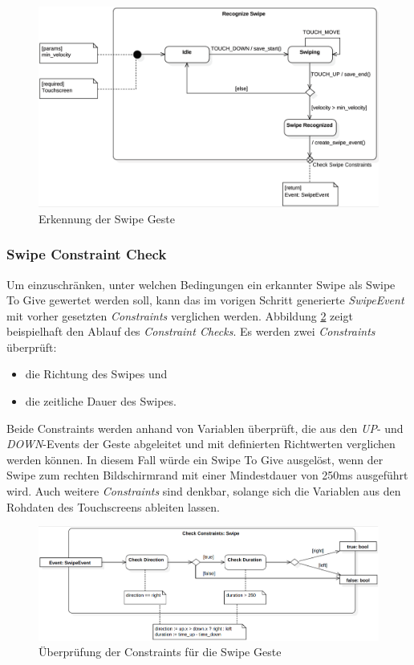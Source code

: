 {\begin{figure}[h]
\includegraphics[width=\textwidth]{swipe_recognize.png}
\caption{Erkennung der Swipe Geste}
\label{recognize_swipe}
\end{figure}

\subsubsection*{Swipe Constraint Check}
Um einzuschränken, unter welchen Bedingungen ein erkannter Swipe als Swipe To Give gewertet werden soll, kann das im vorigen Schritt generierte \textit{SwipeEvent} mit vorher gesetzten \textit{Constraints} verglichen werden. Abbildung \ref{check_constraints} zeigt beispielhaft den Ablauf des \textit{Constraint Checks}. Es werden zwei \textit{Constraints} überprüft:
\begin{itemize}
\item die Richtung des Swipes und
\item die zeitliche Dauer des Swipes.
\end{itemize}
Beide Constraints werden anhand von Variablen überprüft, die aus den \textit{UP}- und \textit{DOWN}-Events der Geste abgeleitet und mit definierten Richtwerten verglichen werden können. In diesem Fall würde ein Swipe To Give ausgelöst, wenn der Swipe zum rechten Bildschirmrand mit einer Mindestdauer von 250ms ausgeführt wird. Auch weitere \textit{Constraints} sind denkbar, solange sich die Variablen aus den Rohdaten des Touchscreens ableiten lassen.

\begin{figure}[h]
\includegraphics[width=\textwidth]{swipe_check_constraints.png}
\caption{Überprüfung der Constraints für die Swipe Geste}
\label{check_constraints}
\end{figure}

}
